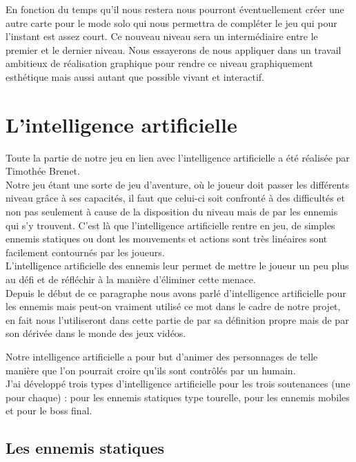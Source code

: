 \documentclass[12pt]{article}
\begin{document}
En fonction du temps qu'il nous restera nous pourront éventuellement créer une autre carte pour le mode solo qui nous permettra de compléter le jeu qui pour l'instant est assez court. Ce nouveau niveau sera un intermédiaire entre le premier et le dernier niveau. Nous essayerons de nous appliquer dans un travail ambitieux de réalisation graphique pour rendre ce niveau graphiquement esthétique mais aussi autant que possible vivant et interactif.

\section{L'intelligence artificielle}

Toute la partie de notre jeu en lien avec l'intelligence artificielle a été réalisée par Timothée Brenet.\\
Notre jeu étant une sorte de jeu d'aventure, où le joueur doit passer les différents niveau grâce à ses capacités, il faut que celui-ci soit confronté à des difficultés et non pas seulement à cause de la disposition du niveau mais de par les ennemis qui s'y trouvent. C'est là que l'intelligence artificielle rentre en jeu, de simples ennemis statiques ou dont les mouvements et actions sont très linéaires sont facilement contournés par les joueurs.\\
L'intelligence artificielle des ennemis leur permet de mettre le joueur un peu plus au défi et de réfléchir à la manière d'éliminer cette menace.\\

Depuis le début de ce paragraphe nous avons parlé d'intelligence artificielle pour les ennemis mais peut-on vraiment utilisé ce mot dans le cadre de notre projet, en fait nous l'utiliseront dans cette partie de par sa définition propre mais de par son dérivée dans le monde des jeux vidéos. 

\newpage

Notre intelligence artificielle a pour but d'animer des personnages de telle manière que l'on pourrait croire qu'ils sont contrôlés par un humain.\\

J'ai développé trois types d'intelligence artificielle pour les trois soutenances (une pour chaque) : pour les ennemis statiques type tourelle, pour les ennemis mobiles et pour le boss final.

\subsection{Les ennemis statiques}
\end{document}
